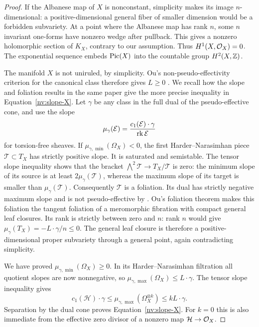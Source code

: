 \begin{proof}
If the Albanese map of \(X\) is nonconstant, simplicity makes its image
\(n\)-dimensional: a positive-dimensional general fiber of smaller
dimension would be a forbidden subvariety.  At a point where the Albanese
map has rank \(n\), some \(n\) invariant one-forms have nonzero wedge after
pullback.  This gives a nonzero holomorphic section of \(K_X\), contrary to
our assumption.  Thus \(H^1(X,\mathcal O_X)=0\).  The exponential sequence embeds
\(\operatorname{Pic}(X)\) into the countable group \(H^2(X,\mathbb Z)\).

The manifold \(X\) is not uniruled, by simplicity.  Ou's
non-pseudo-effectivity criterion for the canonical class therefore gives
\(L\ge0\) \cite[Theorem~1.1]{Ou2025}.  We recall how the slope and foliation
results in the same paper give the more precise inequality in
Equation~\eqref{nv:slope-X}.  Let \(\gamma\) be any class in the full dual of the
pseudo-effective cone, and use the slope
\[
 \mu_\gamma(\mathcal{E})
   =\frac{c_1(\mathcal{E})\cdot\gamma}{\operatorname{rk}\mathcal{E}}
\]
for torsion-free sheaves.  If
\(\mu_{\gamma,\min}(\Omega_X)<0\), the first Harder--Narasimhan piece
\(\mathscr T\subset T_X\) has strictly positive slope.  It is saturated and
semistable.  The tensor slope inequality shows that the bracket
\(\bigwedge^2\mathscr T\to T_X/\mathscr T\) is zero: the minimum slope of
its source is at least \(2\mu_\gamma(\mathscr T)\), whereas the maximum
slope of its target is smaller than \(\mu_\gamma(\mathscr T)\).
Consequently \(\mathscr T\) is a foliation.  Its dual has strictly negative
maximum slope and is not pseudo-effective by
\cite[Proposition~4.5]{Ou2025}.  Ou's foliation theorem
\cite[Theorem~1.4]{Ou2025} makes this foliation the tangent foliation of a
meromorphic fibration with compact general leaf closures.  Its rank is strictly
between zero and \(n\): rank \(n\) would give
\(\mu_\gamma(T_X)=-L\cdot\gamma/n\le0\).  The general leaf closure is
therefore a positive-dimensional proper subvariety through a general
point, again contradicting simplicity.

We have proved \(\mu_{\gamma,\min}(\Omega_X)\ge0\).  In its
Harder--Narasimhan filtration all quotient slopes are now nonnegative, so
\(\mu_{\gamma,\max}(\Omega_X)\le L\cdot\gamma\).  The tensor slope
inequality \cite[Lemma~4.4]{Ou2025} gives
\[
 c_1(\mathscr H)\cdot\gamma
 \le \mu_{\gamma,\max}(\Omega_X^{\otimes k})
 \le kL\cdot\gamma .
\]
Separation by the dual cone proves Equation~\eqref{nv:slope-X}.  For \(k=0\) this is
also immediate from the effective zero divisor of a nonzero map
\(\mathcal{H}\to\mathcal O_X\).


\end{proof}
